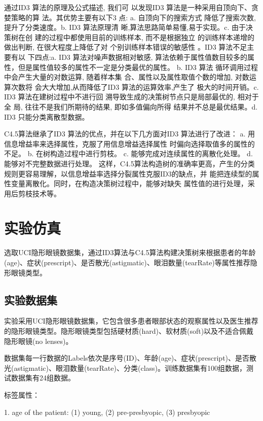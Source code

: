 \documentclass[11pt,a4paper]{article}
\begin{document}
通过ID3 算法的原理及公式描述, 我们可
以发现ID3 算法是一种采用自顶向下、贪婪策略的算
法。其优势主要有以下3 点: a. 自顶向下的搜索方式
降低了搜索次数,提升了分类速度。b. ID3 算法原理清
晰,算法思路简单易懂,易于实现。c. 由于决策树在创
建的过程中都使用目前的训练样本, 而不是根据独立
的训练样本递增的做出判断, 在很大程度上降低了对
个别训练样本错误的敏感性 。\cite{r1}ID3 算法不足主要有以
下四点:a. ID3 算法对噪声数据相对敏感, 算法依赖于属性值数目较多的属
性，但是属性值较多的属性不一定是分类最优的属性。 b.  ID3 算法
循环调用过程中会产生大量的对数运算, 随着样本集
合、属性以及属性取值个数的增加, 对数运算次数将
会大大增加,从而降低了ID3 算法的运算效率,产生了
极大的时间开销。c. ID3 算法在建树过程中不进行回
溯导致生成的决策树节点只是局部最优的, 相对于全
局, 往往不是我们所期待的结果, 即如多值偏向所得
结果并不总是最优结果。d. ID3 只能分类离散型数据。\cite{r6}

C4.5算法继承了ID3 算法的优点，并在以下几方面对ID3 算法进行了改进\cite{r5}：
a. 用信息增益率来选择属性，克服了用信息增益选择属性
时偏向选择取值多的属性的不足。
b. 在树构造过程中进行剪枝。
c. 能够完成对连续属性的离散化处理。
d. 能够对不完整数据进行处理。
这样，C4.5算法构造树的准确率更高，产生的分类
规则更容易理解，以信息增益率选择分裂属性克服ID3的缺点，并
能把连续型的属性变量离散化。同时，在构造决策树过程中，能够对缺失
属性值的进行处理，采用后剪枝技术等。\cite{r3}


\section{实验仿真}

选取UCI隐形眼镜数据集，通过ID3算法与C4.5算法构建决策树来根据患者的年龄(age)、症状(prescript)、是否散光(astigmatic)、眼泪数量(tearRate)等属性推荐隐形眼镜类型。

\subsection{实验数据集}

实验采用UCI隐形眼镜数据集，它包含很多患者眼部状态的观察属性以及医生推荐的隐形眼镜类型。隐形眼镜类型包括硬材质(hard)、软材质(soft)以及不适合佩戴隐形眼镜(no lenses)。

数据集每一行数据的Labels依次是序号(ID)、年龄(age)、症状(prescript)、是否散光(astigmatic)、眼泪数量(tearRate)、分类(class)。训练数据集有100组数据，测试数据集有24组数据。

标签属性：

    1. age of the patient: (1) young, (2) pre-presbyopic, (3) presbyopic
    
\end{document}
